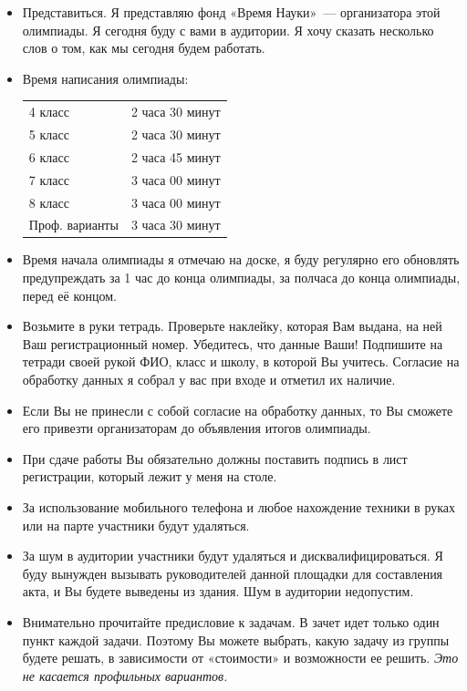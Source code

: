 \documentclass[a4paper,12pt]{article}
\begin{document}
\begin{itemize}
	\item Представиться. Я представляю фонд «Время Науки»~— организатора этой олимпиады. Я сегодня буду с вами в аудитории. Я хочу сказать несколько слов о том, как мы сегодня будем работать.
	\item Время написания олимпиады: \begin{center} \begin{tabular}{ll}
		4 класс & 2 часа 30 минут \\
		5 класс & 2 часа 30 минут \\
		6 класс & 2 часа 45 минут \\
		7 класс & 3 часа 00 минут \\
		8 класс & 3 часа 00 минут \\
		Проф. варианты & 3 часа 30 минут \\
	\end{tabular} \end{center}
	\item Время начала олимпиады я отмечаю на доске, я буду регулярно его обновлять предупреждать за 1 час до конца олимпиады, за полчаса до конца олимпиады, перед её концом. 
	\item Возьмите в руки тетрадь. Проверьте наклейку, которая Вам выдана, на ней Ваш регистрационный номер. Убедитесь, что данные Ваши! Подпишите на тетради своей рукой ФИО, класс и школу, в которой Вы учитесь. Согласие на обработку данных я собрал у вас при входе и отметил их наличие. 
	\item Если Вы не принесли с собой согласие на обработку данных, то Вы сможете его привезти организаторам до объявления итогов олимпиады.
	\item При сдаче работы Вы обязательно должны поставить подпись в лист регистрации, который лежит у меня на столе.
	\item За использование мобильного телефона и любое нахождение техники в руках или на парте участники будут удаляться.
	\item За шум в аудитории участники будут удаляться и дисквалифицироваться. Я буду вынужден вызывать руководителей данной площадки для составления акта, и Вы будете выведены из здания. Шум в аудитории недопустим. 
	\item Внимательно прочитайте предисловие к задачам. В зачет идет только один пункт каждой задачи. Поэтому Вы можете выбрать, какую задачу из группы будете решать, в зависимости от  «стоимости» и возможности ее решить. {\itshape Это не касается профильных вариантов.}

\end{itemize}
\end{document}
